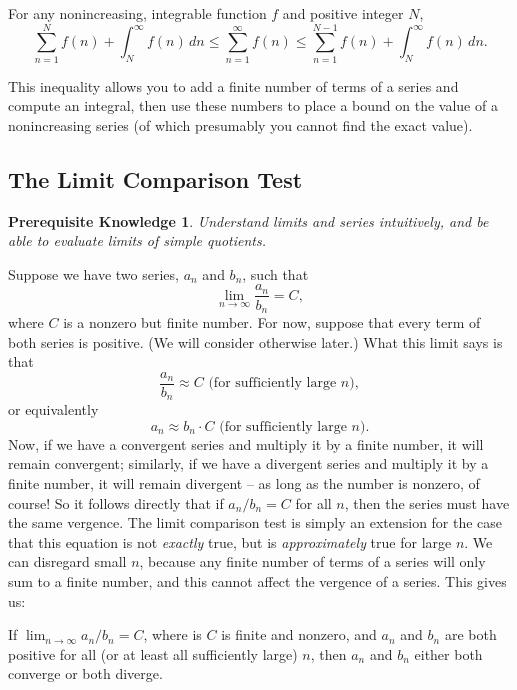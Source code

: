\documentclass{myarticle}
\theoremstyle{nospace}
\newtheorem*{oldprereq}{Prerequisite Knowledge}
\newenvironment{prereq}{\begin{mdframed}\begin{oldprereq}}{\end{oldprereq}\end{mdframed}}
\newtheorem{old series theorem}{Theorem}
\newenvironment{series theorem}{\begin{mdframed}\begin{old series theorem}}{\end{old series theorem}\end{mdframed}}
\begin{document}
\begin{series theorem} For any nonincreasing, integrable function $f$ and positive integer $N$, \[ \sum_{n=1}^N f(n) + \int_N^\infty f(n) \,dn \leq \sum_{n=1}^\infty f(n) \leq \sum_{n=1}^{N-1} f(n) + \int_N^\infty f(n) \,dn. \] \end{series theorem}

This inequality allows you to add a finite number of terms of a series and compute an integral, then use these numbers to place a bound on the value of a nonincreasing series (of which presumably you cannot find the exact value).

\subsection{The Limit Comparison Test} \label{sec:limit comparison test}

\begin{prereq} Understand limits and series intuitively, and be able to evaluate limits of simple quotients. \end{prereq}

Suppose we have two series, $a_n$ and $b_n$, such that \[ \lim_{n \to \infty} \frac{a_n}{b_n} = C, \] where $C$ is a nonzero but finite number. For now, suppose that every term of both series is positive. (We will consider otherwise later.) What this limit says is that \[ \frac{a_n}{b_n} \approx C \text{ (for sufficiently large $n$)}, \] or equivalently \[ a_n \approx b_n \cdot C \text{ (for sufficiently large $n$)}. \] Now, if we have a convergent series and multiply it by a finite number, it will remain convergent; similarly, if we have a divergent series and multiply it by a finite number, it will remain divergent -- as long as the number is nonzero, of course! So it follows directly that if $a_n/b_n = C$ for all $n$, then the series must have the same vergence. The limit comparison test is simply an extension for the case that this equation is not \emph{exactly} true, but is \emph{approximately} true for large $n$. We can disregard small $n$, because any finite number of terms of a series will only sum to a finite number, and this cannot affect the vergence of a series. This gives us:

\begin{series theorem} If $\lim_{n \to \infty} a_n/b_n = C$, where is $C$ is finite and nonzero, and $a_n$ and $b_n$ are both positive for all (or at least all sufficiently large) $n$, then $a_n$ and $b_n$ either both converge or both diverge. \end{series theorem}
\end{document}
